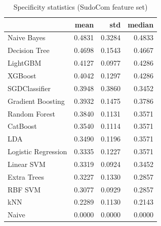 \begin{table}
\caption{Specificity statistics (SudoCom feature set)}
\label{tab:specificity_SudoCom_stats}
\begin{tabular}{lrrr}
\toprule
 & mean & std & median \\
\midrule
Naive Bayes & 0.4831 & 0.3284 & 0.4833 \\
Decision Tree & 0.4698 & 0.1543 & 0.4667 \\
LightGBM & 0.4127 & 0.0977 & 0.4286 \\
XGBoost & 0.4042 & 0.1297 & 0.4286 \\
SGDClassifier & 0.3948 & 0.3860 & 0.3452 \\
Gradient Boosting & 0.3932 & 0.1475 & 0.3786 \\
Random Forest & 0.3840 & 0.1131 & 0.3571 \\
CatBoost & 0.3540 & 0.1114 & 0.3571 \\
LDA & 0.3490 & 0.1196 & 0.3571 \\
Logistic Regression & 0.3335 & 0.1227 & 0.3571 \\
Linear SVM & 0.3319 & 0.0924 & 0.3452 \\
Extra Trees & 0.3227 & 0.1330 & 0.2857 \\
RBF SVM & 0.3077 & 0.0929 & 0.2857 \\
kNN & 0.2289 & 0.1130 & 0.2143 \\
Naive & 0.0000 & 0.0000 & 0.0000 \\
\bottomrule
\end{tabular}
\end{table}
